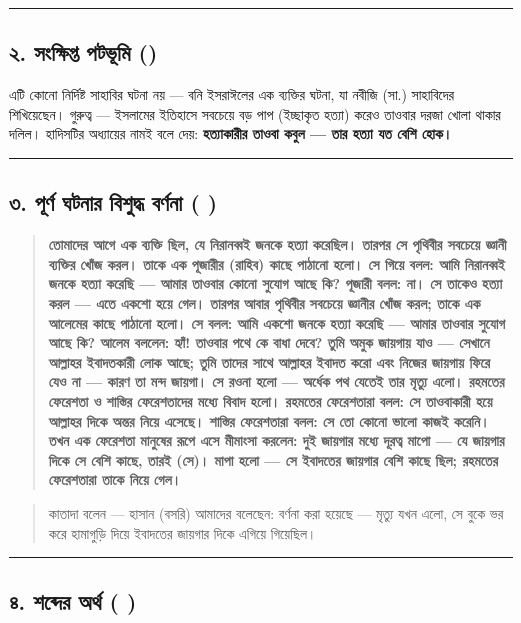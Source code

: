 \medskip\hrule\medskip

\subsection*{২. সংক্ষিপ্ত পটভূমি ()}

এটি কোনো নির্দিষ্ট সাহাবির ঘটনা নয় — বনি ইসরাঈলের এক ব্যক্তির ঘটনা, যা নবীজি (সা.) সাহাবিদের শিখিয়েছেন। গুরুত্ব — ইসলামের ইতিহাসে সবচেয়ে বড় পাপ (ইচ্ছাকৃত হত্যা) করেও তাওবার দরজা খোলা থাকার দলিল। হাদিসটির অধ্যায়ের নামই বলে দেয়: \textbf{হত্যাকারীর তাওবা কবুল — তার হত্যা যত বেশি হোক।}

\medskip\hrule\medskip

\subsection*{৩. পূর্ণ ঘটনার বিশুদ্ধ বর্ণনা (  )}

\begin{quote}
\textbf{তোমাদের আগে এক ব্যক্তি ছিল, যে নিরানব্বই জনকে হত্যা করেছিল। তারপর সে পৃথিবীর সবচেয়ে জ্ঞানী ব্যক্তির খোঁজ করল। তাকে এক পূজারীর (রাহিব) কাছে পাঠানো হলো। সে গিয়ে বলল: আমি নিরানব্বই জনকে হত্যা করেছি — আমার তাওবার কোনো সুযোগ আছে কি? পূজারী বলল: না। সে তাকেও হত্যা করল — এতে একশো হয়ে গেল। তারপর আবার পৃথিবীর সবচেয়ে জ্ঞানীর খোঁজ করল; তাকে এক আলেমের কাছে পাঠানো হলো। সে বলল: আমি একশো জনকে হত্যা করেছি — আমার তাওবার সুযোগ আছে কি? আলেম বললেন: হ্যাঁ! তাওবার পথে কে বাধা দেবে? তুমি অমুক জায়গায় যাও — সেখানে আল্লাহর ইবাদতকারী লোক আছে; তুমি তাদের সাথে আল্লাহর ইবাদত করো এবং নিজের জায়গায় ফিরে যেও না — কারণ তা মন্দ জায়গা। সে রওনা হলো — অর্ধেক পথ যেতেই তার মৃত্যু এলো। রহমতের ফেরেশতা ও শাস্তির ফেরেশতাদের মধ্যে বিবাদ হলো। রহমতের ফেরেশতারা বলল: সে তাওবাকারী হয়ে আল্লাহর দিকে অন্তর নিয়ে এসেছে। শাস্তির ফেরেশতারা বলল: সে তো কোনো ভালো কাজই করেনি। তখন এক ফেরেশতা মানুষের রূপে এসে মীমাংসা করলেন: দুই জায়গার মধ্যে দূরত্ব মাপো — যে জায়গার দিকে সে বেশি কাছে, তারই (সে)। মাপা হলো — সে ইবাদতের জায়গার বেশি কাছে ছিল; রহমতের ফেরেশতারা তাকে নিয়ে গেল।}
\end{quote}

\begin{quote}
কাতাদা বলেন — হাসান (বসরি) আমাদের বলেছেন: বর্ণনা করা হয়েছে — মৃত্যু যখন এলো, সে বুকে ভর করে হামাগুড়ি দিয়ে ইবাদতের জায়গার দিকে এগিয়ে গিয়েছিল।
\end{quote}

\medskip\hrule\medskip

\subsection*{৪. শব্দের অর্থ ( )}

